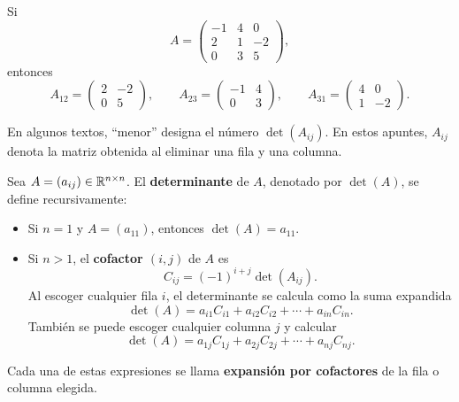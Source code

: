 \documentclass[compacto,10pt]{pubciencias-notas}
\begin{document}
\begin{ejem}
    Si
    \[
        A=\begin{pmatrix}-1&4&0\\2&1&-2\\0&3&5\end{pmatrix},
    \]
    entonces
    \[
        A_{12}=\begin{pmatrix}2&-2\\0&5\end{pmatrix},
        \qquad
        A_{23}=\begin{pmatrix}-1&4\\0&3\end{pmatrix},
        \qquad
        A_{31}=\begin{pmatrix}4&0\\1&-2\end{pmatrix}.
    \]
\end{ejem}

\begin{advertencia}
    En algunos textos, ``menor'' designa el número $\det(A_{ij})$. En estos
    apuntes, $A_{ij}$ denota la matriz obtenida al eliminar una fila y una
    columna.
\end{advertencia}

\begin{defi}[Determinante]\label{sem04cl02:def-determinante}
    Sea $A=(a_{ij})\in\Mat[\R]{n}{n}$. El \textbf{determinante} de $A$,
    denotado por $\det(A)$, se define recursivamente:
    \begin{itemize}
        \item Si $n=1$ y $A=(a_{11})$, entonces $\det(A)=a_{11}$.
        \item Si $n>1$, el \textbf{cofactor $(i,j)$} de $A$ es
              \[
                  C_{ij}=(-1)^{i+j}\det(A_{ij}).
              \]
              Al escoger cualquier fila $i$, el determinante se calcula como
              la suma expandida
              \[
                  \det(A)=a_{i1}C_{i1}+a_{i2}C_{i2}+\cdots+a_{in}C_{in}.
              \]
              También se puede escoger cualquier columna $j$ y calcular
              \[
                  \det(A)=a_{1j}C_{1j}+a_{2j}C_{2j}+\cdots+a_{nj}C_{nj}.
              \]
    \end{itemize}
    Cada una de estas expresiones se llama \textbf{expansión por cofactores}
    de la fila o columna elegida.
\end{defi}
\end{document}
